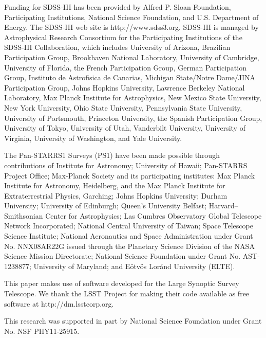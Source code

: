 \documentclass[fleqn,usenatbib]{mnras}
\begin{document}
  Funding for SDSS-III has been provided by Alfred P. Sloan Foundation, 
  Participating Institutions, National Science Foundation, and  U.S.  Department of
  Energy. The SDSS-III web site is http://www.sdss3.org.  SDSS-III is managed by 
  Astrophysical Research Consortium for the Participating Institutions of the SDSS-III
  Collaboration, which includes  University of Arizona,  Brazilian Participation Group,
  Brookhaven National Laboratory, University of Cambridge, University of Florida, the
  French Participation Group,  German Participation Group, Instituto de Astrofisica
  de Canarias,  Michigan State/Notre Dame/JINA Participation Group, Johns Hopkins
  University, Lawrence Berkeley National Laboratory, Max Planck Institute for
  Astrophysics, New Mexico State University, New York University, Ohio State University,
  Pennsylvania State University, University of Portsmouth, Princeton University, the
  Spanish Participation Group, University of Tokyo, University of Utah, Vanderbilt
  University, University of Virginia, University of Washington, and Yale University.
  
  The Pan-STARRS1 Surveys (PS1) have been made possible through contributions of  
  Institute for Astronomy;  University of Hawaii;  Pan-STARRS Project Office; 
   Max-Planck Society and its participating institutes:  Max Planck Institute 
  for Astronomy, Heidelberg, and the Max Planck Institute for Extraterrestrial Physics, 
  Garching;  Johns Hopkins University; Durham University;  University of Edinburgh; 
  Queen's University Belfast;  Harvard--Smithsonian Center for Astrophysics;  Las 
  Cumbres Observatory Global Telescope Network Incorporated;  National Central 
  University of Taiwan;  Space Telescope Science Institute; National Aeronautics 
  and Space Administration under Grant No. NNX08AR22G issued through the Planetary 
  Science Division of the NASA Science Mission Directorate; National Science 
  Foundation under Grant No. AST-1238877; University of Maryland; and Eötvös Loránd 
  University (ELTE).
  
  This paper makes use of software developed for the Large Synoptic Survey 
  Telescope. We thank the LSST Project for making their code available as free 
  software at http://dm.lsstcorp.org.
  
  This research was supported in part by National Science Foundation under Grant 
  No. NSF PHY11-25915. 
 
\end{document}

